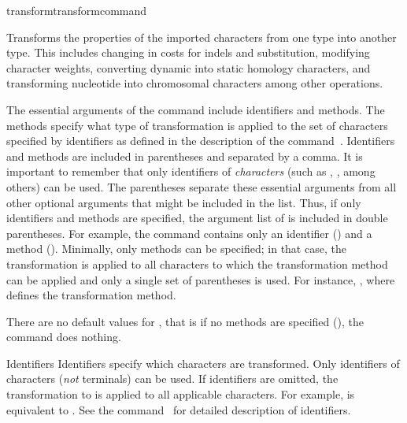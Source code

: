 \begin{command}{transform}{transformcommand}


	\begin{poydescription} 
            Transforms the properties of the imported characters from one type into
            another type. This includes changing in costs for indels and substitution,
            modifying character weights, converting dynamic into static homology characters,
            and transforming nucleotide into chromosomal characters
            among other operations.
            
            The essential arguments of the command
             include identifiers and methods. The methods
            specify what type of transformation is applied to the set of characters
            specified by identifiers as defined in the description of the command~.
            Identifiers and methods are included in parentheses and separated by
            a comma. It is important to remember that only identifiers of
            \emph{characters} (such as , , among
            others) can be used. The parentheses separate these essential
            arguments from all other optional arguments that might be included
            in the list. Thus, if only identifiers and methods are specified,
            the argument list of  is included in double
            parentheses. For example, the command  contains only an identifier () and a
            method ().  Minimally, only methods can be
            specified; in that case, the transformation is applied to all
            characters to which the transformation method can be applied and only a
            single set of parentheses is used. For instance,
            , where
             defines
            the transformation method.

            There are no default values for , that is if
            no methods are specified (), the command does nothing.
	\end{poydescription}

	\begin{arguments}
	
        \begin{argumentgroup}{Identifiers}
            Identifiers specify which characters are transformed. Only
            identifiers of characters (\emph{not} terminals) can be used. If
            identifiers are omitted, the transformation to is applied to all
            applicable characters. For example,
             is equivalent to
            . See the command~
            for detailed description of identifiers.
        \end{argumentgroup}
           

\end{arguments}
\end{command}
